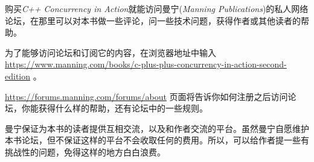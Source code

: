 
购买\textit{C++ Concurrency in Action}就能访问曼宁(\textit{Manning Publications})的私人网络论坛，在那里可以对本书做一些评论，问一些技术问题，获得作者或其他读者的帮助。

为了能够访问论坛和订阅它的内容，在浏览器地址中输入 \url{https://www.manning.com/books/c-plus-plus-concurrency-in-action-second-edition} 。

\url{https://forums.manning.com/forums/about} 页面将告诉你如何注册之后访问论坛，你能获得什么样的帮助，还有论坛中的一些规则。

曼宁保证为本书的读者提供互相交流，以及和作者交流的平台。虽然曼宁自愿维护本书论坛，但不保证这样的平台不会收取任何的费用。所以，可以给作者提一些有挑战性的问题，免得这样的地方白白浪费。